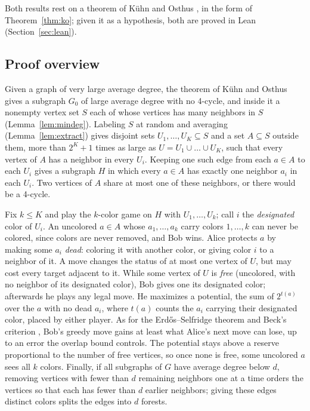 \documentclass[11pt]{article}
\theoremstyle{remark}
\begin{document}
Both results rest on a theorem of Kühn and Osthus \cite[Theorem~1]{KO}, in
the form of Theorem~\ref{thm:ko}; given it as a hypothesis, both are proved
in Lean (Section~\ref{sec:lean}).

\subsection{Proof overview}
Given a graph of very large average degree, the theorem of Kühn and Osthus
gives a subgraph $G_0$ of large average degree with no 4-cycle, and inside
it a nonempty vertex set $S$ each of whose vertices has many neighbors in
$S$ (Lemma~\ref{lem:mindeg}). Labeling $S$ at random and averaging
(Lemma~\ref{lem:extract}) gives disjoint sets $U_1,\dots,U_K\subseteq S$
and a set $A\subseteq S$ outside them, more than $2^K+1$ times as large as
$U=U_1\cup\dots\cup U_K$, such that every vertex of $A$ has a neighbor in
every $U_i$. Keeping one such edge from each $a\in A$ to each $U_i$ gives a
subgraph $H$ in which every $a\in A$ has exactly one neighbor $a_i$ in each
$U_i$. Two vertices of $A$ share at most one of these neighbors, or there
would be a 4-cycle.

Fix $k\le K$ and play the $k$-color game on $H$ with $U_1,\dots,U_k$; call
$i$ the \emph{designated} color of $U_i$. An uncolored $a\in A$ whose
$a_1,\dots,a_k$ carry colors $1,\dots,k$ can never be colored, since colors
are never removed, and Bob wins. Alice protects $a$ by making some $a_i$
\emph{dead}: coloring it with another color, or giving color $i$ to a
neighbor of it. A move changes the status of at most one vertex of $U$, but
may cost every target adjacent to it. While some vertex of $U$ is
\emph{free} (uncolored, with no neighbor of its designated color), Bob
gives one its designated color; afterwards he plays any legal move. He
maximizes a potential, the sum of $2^{t(a)}$ over the $a$ with no dead
$a_i$, where $t(a)$ counts the $a_i$ carrying their designated color,
placed by either player. As for the Erdős--Selfridge theorem
\cite[p.~299]{ES} and Beck's criterion \cite{Be}, Bob's greedy move gains
at least what Alice's next move can lose, up to an error the overlap bound
controls. The potential stays above a reserve proportional to the number
of free vertices, so once none is free, some uncolored $a$ sees all $k$
colors. Finally, if all subgraphs of $G$ have average degree below $d$, removing
vertices with fewer than $d$ remaining neighbors one at a time orders the
vertices so that each has fewer than $d$ earlier neighbors; giving these
edges distinct colors splits the edges into $d$ forests.
\end{document}
